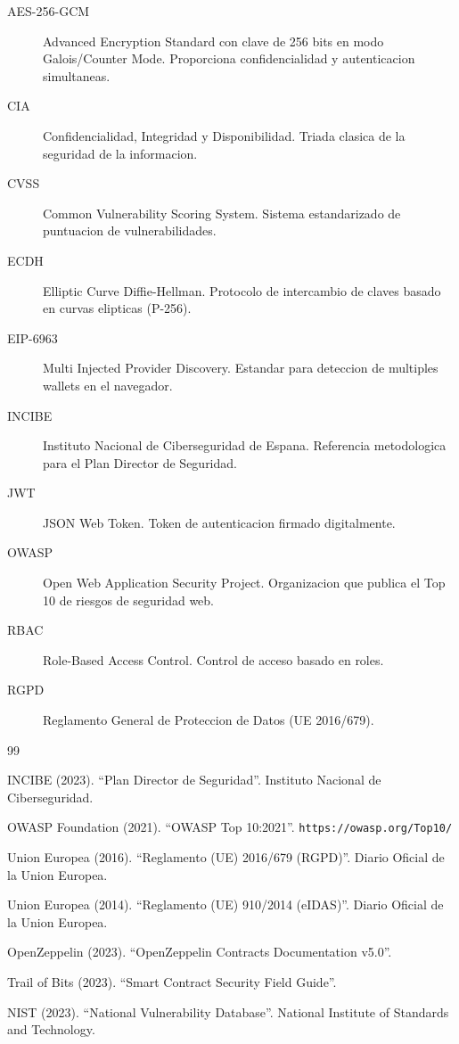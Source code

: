 \documentclass[11pt, a4paper]{article}
\begin{document}
\begin{description}
    \item[AES-256-GCM] Advanced Encryption Standard con clave de 256 bits en modo Galois/Counter Mode. Proporciona confidencialidad y autenticacion simultaneas.
    \item[CIA] Confidencialidad, Integridad y Disponibilidad. Triada clasica de la seguridad de la informacion.
    \item[CVSS] Common Vulnerability Scoring System. Sistema estandarizado de puntuacion de vulnerabilidades.
    \item[ECDH] Elliptic Curve Diffie-Hellman. Protocolo de intercambio de claves basado en curvas elipticas (P-256).
    \item[EIP-6963] Multi Injected Provider Discovery. Estandar para deteccion de multiples wallets en el navegador.
    \item[INCIBE] Instituto Nacional de Ciberseguridad de Espana. Referencia metodologica para el Plan Director de Seguridad.
    \item[JWT] JSON Web Token. Token de autenticacion firmado digitalmente.
    \item[OWASP] Open Web Application Security Project. Organizacion que publica el Top 10 de riesgos de seguridad web.
    \item[RBAC] Role-Based Access Control. Control de acceso basado en roles.
    \item[RGPD] Reglamento General de Proteccion de Datos (UE 2016/679).
\end{description}

\begin{thebibliography}{99}
    \item INCIBE (2023). ``Plan Director de Seguridad''. Instituto Nacional de Ciberseguridad.
    \item OWASP Foundation (2021). ``OWASP Top 10:2021''. \texttt{https://owasp.org/Top10/}
    \item Union Europea (2016). ``Reglamento (UE) 2016/679 (RGPD)''. Diario Oficial de la Union Europea.
    \item Union Europea (2014). ``Reglamento (UE) 910/2014 (eIDAS)''. Diario Oficial de la Union Europea.
    \item OpenZeppelin (2023). ``OpenZeppelin Contracts Documentation v5.0''.
    \item Trail of Bits (2023). ``Smart Contract Security Field Guide''.
    \item NIST (2023). ``National Vulnerability Database''. National Institute of Standards and Technology.
\end{thebibliography}
\end{document}
